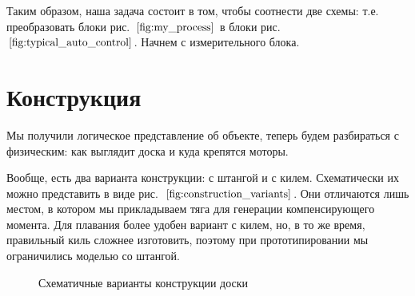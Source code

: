 \documentclass[12pt,a4paper]{article}
\begin{document}
Таким образом, наша задача состоит в том, чтобы соотнести две схемы: т.е. преобразовать блоки рис.~$\ref{fig:my_process}$ в блоки рис.~$\ref{fig:typical_auto_control}$.
Начнем с измерительного блока.

\section{Конструкция}

Мы получили логическое представление об объекте, теперь будем разбираться с физическим: как выглядит доска и куда крепятся моторы.

Вообще, есть два варианта конструкции: с штангой и с килем. Схематически их можно представить в виде рис.~$\ref{fig:construction_variants}$. Они отличаются лишь местом, в котором мы прикладываем тяга для генерации компенсирующего момента. Для плавания более удобен вариант с килем, но, в то же время, правильный киль сложнее изготовить, поэтому при прототипировании мы ограничились моделью со штангой.

\begin{figure}[h]
	\begin{minipage}[h]{0.49\linewidth}
	\end{minipage}
	\hfill
	\begin{minipage}[h]{0.49\linewidth}
	\end{minipage}
	\caption{Схематичные варианты конструкции доски}
	\label{fig:construction_variants}
\end{figure}
\end{document}
